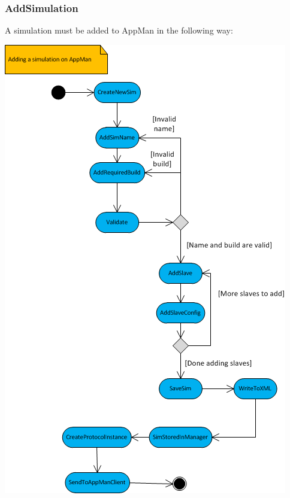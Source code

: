 \documentclass[a4paper,12pt,final]{article}
\begin{document}
\subsubsection{AddSimulation}
A simulation must be added to AppMan in the following way:
\begin{center}
\includegraphics[scale=0.9]{AddSimulationActivity.png}
\end{center}
\end{document}
